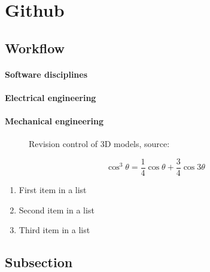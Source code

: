 \documentclass[fleqn,10pt]{SelfArx} %
\begin{document}
\section{Github}

\subsection{Workflow}

\paragraph{Software disciplines}

\paragraph{Electrical engineering}

\paragraph{Mechanical engineering}

\begin{figure}[ht]\centering %
\caption{Revision control of 3D models, source: \citeauthor{skalnik_3d_2013}\cite{skalnik_3d_2013}}
\label{fig:view}
\end{figure}

\lipsum[4] %

\begin{equation}
\cos^3 \theta =\frac{1}{4}\cos\theta+\frac{3}{4}\cos 3\theta
\label{eq:refname2}
\end{equation}

\lipsum[5] %

\begin{enumerate}[noitemsep] %
\item First item in a list
\item Second item in a list
\item Third item in a list
\end{enumerate}

\subsection{Subsection}
\end{document}
